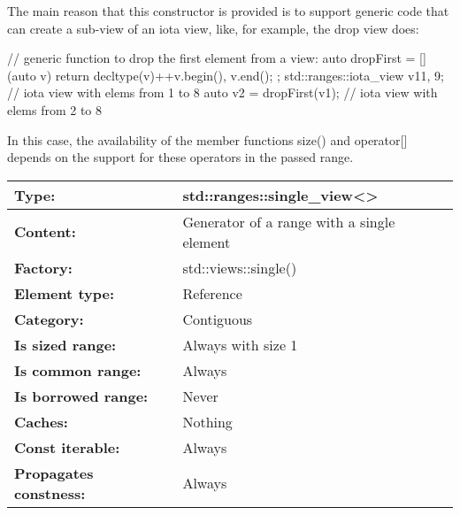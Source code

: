 The main reason that this constructor is provided is to support generic code that can create a sub-view of an iota view, like, for example, the drop view does:

\begin{cpp}
// generic function to drop the first element from a view:
auto dropFirst = [] (auto v) {
						return decltype(v){++v.begin(), v.end()};
					};
std::ranges::iota_view v1{1, 9}; // iota view with elems from 1 to 8
auto v2 = dropFirst(v1); // iota view with elems from 2 to 8
\end{cpp}

In this case, the availability of the member functions size() and operator[] depends on the support for these operators in the passed range.


\begin{longtable}[c]{|l|l|}
\hline
\textbf{Type:}                 & std::ranges::single\_view\textless{}\textgreater{} \\ \hline
\endfirsthead
%
\endhead
%
\textbf{Content:}              & Generator of a range with a single element         \\ \hline
\textbf{Factory:}              & std::views::single()                               \\ \hline
\textbf{Element type:}         & Reference                                          \\ \hline
\textbf{Category:}             & Contiguous                                         \\ \hline
\textbf{Is sized range:}       & Always with size 1                                 \\ \hline
\textbf{Is common range:}      & Always                                             \\ \hline
\textbf{Is borrowed range:}    & Never                                              \\ \hline
\textbf{Caches:}               & Nothing                                            \\ \hline
\textbf{Const iterable:}       & Always                                             \\ \hline
\textbf{Propagates constness:} & Always                                             \\ \hline
\end{longtable}

